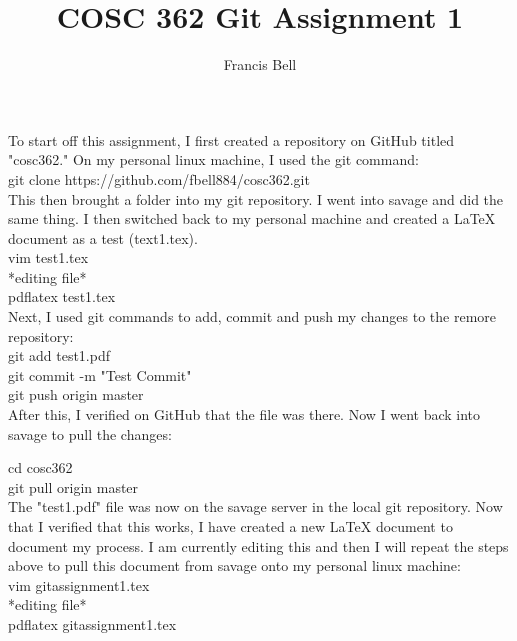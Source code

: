 \documentclass[12pt]{article}
\author{Francis Bell}
\title{COSC 362 Git Assignment 1}
\begin{document}
\maketitle

To start off this assignment, I first created a repository on GitHub titled "cosc362." On my personal linux machine, I used the git command:\\

	git clone https://github.com/fbell884/cosc362.git\\

This then brought a folder into my git repository. I went into savage and did the same thing. I then switched back to my personal machine and created a LaTeX document as a test (text1.tex). 
\\

	vim test1.tex\\

	*editing file*\\

	pdflatex test1.tex\\

Next, I used git commands to add, commit and push my changes to the remore repository:\\

	git add test1.pdf\\
	
	git commit -m "Test Commit"\\ 

	git push origin master\\

After this, I verified on GitHub that the file was there. Now I went back into savage to pull the changes: 

	cd cosc362\\

	git pull origin master\\

The "test1.pdf" file was now on the savage server in the local git repository. Now that I verified that this works, I have created a new LaTeX document to document my process. I am currently editing this and then I will repeat the steps above to pull this document from savage onto my personal linux machine:
\\

	vim gitassignment1.tex\\
	
	*editing file*\\

	pdflatex gitassignment1.tex\\
\end{document}
